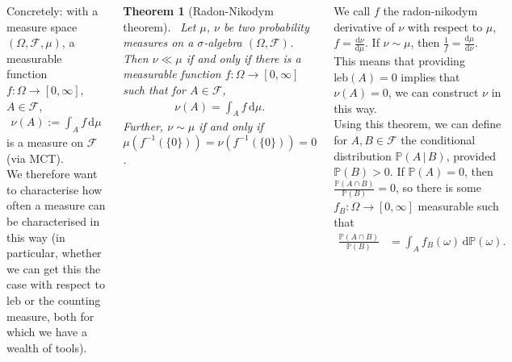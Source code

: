 \documentclass{tikzposter} %
\newtheorem{theorem}{Theorem}
\begin{document}
\begin{columns}
{{      Concretely: with a measure space $(\Omega, \mathcal{F}, \mu)$, a measurable function $f : \Omega \to [0,\infty]$, $A \in \mathcal{F}$,
      \begin{align*}
        \nu(A) := \int_{A} f \, \mathrm{d}\mu
      \end{align*}
      is a measure on $\mathcal{F}$ (via MCT). \\

      We therefore want to characterise how often a measure can be characterised in this way (in particular, whether we can get this the case with respect to $\mathrm{leb}$ or the counting measure, both for which we have a wealth of tools). \\

      \begin{theorem}[Radon-Nikodym theorem]
        \ Let $\mu$, $\nu$ be two probability measures on a $\sigma$-algebra $(\Omega, \mathcal{F})$. Then $\nu \ll \mu$ if and only if there is a measurable function $f : \Omega \to [0,\infty]$ such that for $A \in \mathcal{F}$,
        \begin{align*}
          \nu(A) = \int_{A} f\, \mathrm{d}\mu.
        \end{align*}
        Further, $\nu \sim \mu$ if and only if $\mu(f^{-1}(\{0\})) = \nu(f^{-1}(\{0\})) = 0$.
      \end{theorem}
      \hphantom{}

      We call $f$ the radon-nikodym derivative of $\nu$ with respect to $\mu$, $\displaystyle f = \frac{\mathrm{d}\nu}{\mathrm{d}\mu}$. If $\nu \sim \mu$, then $\displaystyle \frac{1}{f} = \frac{\mathrm{d}\mu}{\mathrm{d}\nu}$. \\

      This means that providing $\mathrm{leb}(A) = 0$ implies that $\nu(A) = 0$, we can construct $\nu$ in this way. \\

      Using this theorem, we can define for $A, B \in \mathcal{F}$ the conditional distribution $\mathbb{P}(A \,|\, B)$, provided $\mathbb{P}(B) > 0$. If $\mathbb{P}(A) = 0$, then $\displaystyle \frac{\mathbb{P}(A \cap B)}{\mathbb{P}(B)} = 0$, so there is some $f_{B} : \Omega \to [0,\infty]$ measurable such that
      \begin{align*}
        \frac{\mathbb{P}(A \cap B)}{\mathbb{P}(B)} &= \int_{A} f_{B}(\omega) \, \mathrm{d}\mathbb{P}(\omega).
      \end{align*}
    }
}

\end{columns}
\end{document}
